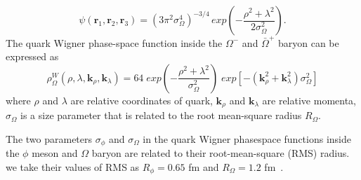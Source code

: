 \documentclass[11pt,a4paper,openany]{article}
\begin{document}
\begin{equation}
  \label{eq:5}
  \psi(\bm{r}_{1},\bm{r}_{2},\bm{r}_{3}) = (3\pi^{2}\sigma_{\Omega}^{4})^{-3/4}\,exp\left(-\frac{\rho^2+\lambda^2}{2\sigma_{\Omega}^{2}}\right).
\end{equation}
The quark Wigner phase-space function inside the $\Omega^{-}$ and $\bar{\Omega}^{+}$ baryon can be
expressed as
\begin{equation}
  \label{eq:6}
  \rho_{\Omega}^{W}(\rho, \lambda, \bm{k}_{\rho}, \bm{k}_{\lambda}) = 64\;exp\left(-\frac{\rho^2+\lambda^2}{\sigma_{\Omega}^{2}}\right)\;exp\left[-(\bm{k}_{\rho}^{2}+\bm{k}_{\lambda}^{2})\sigma_{\Omega}^{2}\right]
\end{equation}
where $\rho$ and $\lambda$ are relative coordinates of quark, $\textbf{k}_\rho$ and
$\textbf{k}_\lambda$ are relative momenta, $\sigma_{\Omega}$ is a size parameter that is related
to the root mean-square radius $R_{\Omega}$.
\par
The two parameters $\sigma_{\phi}$ and $\sigma_{\Omega}$ in the quark Wigner phasespace functions
inside the $\phi$ meson and $\Omega$ baryon are related to their root-mean-square (RMS) radius. we
take their values of RMS as $R_{\phi} = 0.65$ fm and $R_{\Omega} = 1.2$ fm~\cite{COALESCENCE}.
\end{document}
